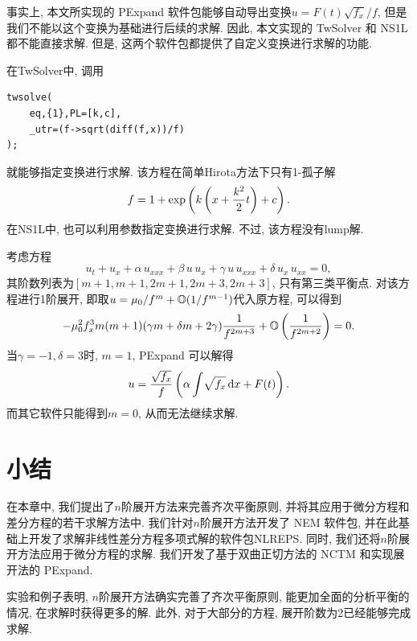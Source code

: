 事实上, 本文所实现的 PExpand 软件包能够自动导出变换$u=F(t)\sqrt{f_x}/f$, 但是我们不能以这个变换为基础进行后续的求解.  因此, 本文实现的 TwSolver 和 NS1L 都不能直接求解. 但是, 这两个软件包都提供了自定义变换进行求解的功能.

在TwSolver中, 调用
\begin{verbatim}
twsolve(
    eq,{1},PL=[k,c],
    _utr=(f->sqrt(diff(f,x))/f)
);
\end{verbatim}
就能够指定变换进行求解. 该方程在简单Hirota方法下只有1-孤子解
\begin{equation}
    f=1+\exp\left(k\left(x+\frac{k^2}{2}t\right)+c\right).
\end{equation}
在NS1L中, 也可以利用参数指定变换进行求解. 不过, 该方程没有lump解.

\begin{example} 
考虑方程 \cite{EMM}
\begin{equation}
    {{u}_{t}}+{{u}_{x}}+\alpha\,{{u}_{xxx}}+\beta\,u\,{{u}_{x}}+\gamma\,u\,{{u}_{xxx}}+\delta\,{{u}_{x}}\,{{u}_{xx}}=0,
\end{equation}
其阶数列表为$[m+1,m+1,2m+1,2m+3,2m+3]$, 只有第三类平衡点. 对该方程进行1阶展开, 即取$u=\mu_0/f^m+\mathbb O(1/f^{m-1})$代入原方程, 可以得到
\begin{equation}
    -\mu_0^2f_x^3m(m+1)(\gamma m+\delta m+2\gamma)\frac{1}{f^{2m+3}}+\mathbb O\left(\frac{1}{f^{2m+2}}\right)=0. 
\end{equation}
当$\gamma=-1,\delta=3$时, $m=1$, PExpand 可以解得 
\begin{equation}
    u=\frac{\sqrt{f_x}}{f}\left(\alpha\int\!{\sqrt{f_x}{\,\rm d}x}+F(t)\right).
\end{equation}
而其它软件只能得到$m=0$, 从而无法继续求解. 
\end{example}

\section{小结}\label{ch4sec7}

在本章中, 我们提出了$n$阶展开方法来完善齐次平衡原则, 并将其应用于微分方程和差分方程的若干求解方法中. 我们针对$n$阶展开方法开发了 NEM 软件包, 并在此基础上开发了求解非线性差分方程多项式解的软件包NLREPS. 同时, 我们还将$n$阶展开方法应用于微分方程的求解. 我们开发了基于双曲正切方法的 NCTM 和实现\Painleve{}展开法的 PExpand. 

实验和例子表明, $n$阶展开方法确实完善了齐次平衡原则, 能更加全面的分析平衡的情况, 在求解时获得更多的解. 此外, 对于大部分的方程, 展开阶数为2已经能够完成求解. 

